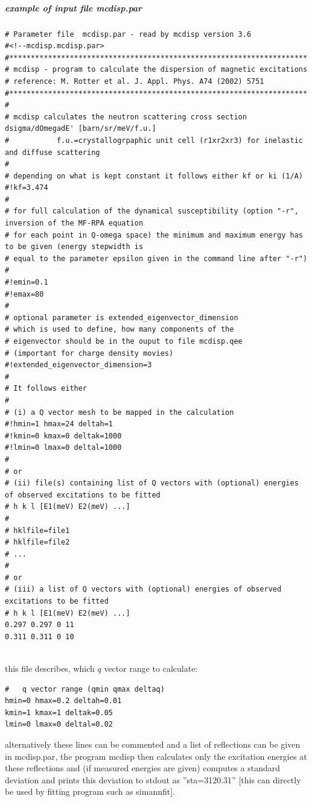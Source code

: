 \subparagraph{example of input file {\prg mcdisp.par}}

{\footnotesize
\begin{verbatim}
# Parameter file  mcdisp.par - read by mcdisp version 3.6
#<!--mcdisp.mcdisp.par>
#*********************************************************************
# mcdisp - program to calculate the dispersion of magnetic excitations
# reference: M. Rotter et al. J. Appl. Phys. A74 (2002) 5751
#*********************************************************************
#
# mcdisp calculates the neutron scattering cross section dsigma/dOmegadE' [barn/sr/meV/f.u.]
#           f.u.=crystallogrpaphic unit cell (r1xr2xr3) for inelastic and diffuse scattering
#
# depending on what is kept constant it follows either kf or ki (1/A)
#!kf=3.474
# 
# for full calculation of the dynamical susceptibility (option "-r", inversion of the MF-RPA equation 
# for each point in Q-omega space) the minimum and maximum energy has to be given (energy stepwidth is 
# equal to the parameter epsilon given in the command line after "-r")
#
#!emin=0.1
#!emax=80
#
# optional parameter is extended_eigenvector_dimension
# which is used to define, how many components of the
# eigenvector should be in the ouput to file mcdisp.qee
# (important for charge density movies)
#!extended_eigenvector_dimension=3
#
# It follows either 
#
# (i) a Q vector mesh to be mapped in the calculation
#!hmin=1 hmax=24 deltah=1
#!kmin=0 kmax=0 deltak=1000
#!lmin=0 lmax=0 deltal=1000
#
# or 
# (ii) file(s) containing list of Q vectors with (optional) energies of observed excitations to be fitted
# h k l [E1(meV) E2(meV) ...]
#
# hklfile=file1
# hklfile=file2
# ...
#
# or
# (iii) a list of Q vectors with (optional) energies of observed excitations to be fitted
# h k l [E1(meV) E2(meV) ...]
0.297 0.297 0 11 
0.311 0.311 0 10 


\end{verbatim}
}

this file describes, which $q$ vector range to
calculate:

\begin{verbatim}
#   q vector range (qmin qmax deltaq)
hmin=0 hmax=0.2 deltah=0.01
kmin=1 kmax=1 deltak=0.05
lmin=0 lmax=0 deltal=0.02
\end{verbatim}

alternatively these lines can be commented and a
list of reflections can be given in {\prg mcdisp.par}, the
program {\prg mcdisp} then calculates only 
the excitation energies at these reflections and (if measured
energies are given) computes a standard deviation
and prints
this deviation to stdout as ''sta=3120.31'' [this can directly
be used by fitting program such as {\prg simannfit}].

